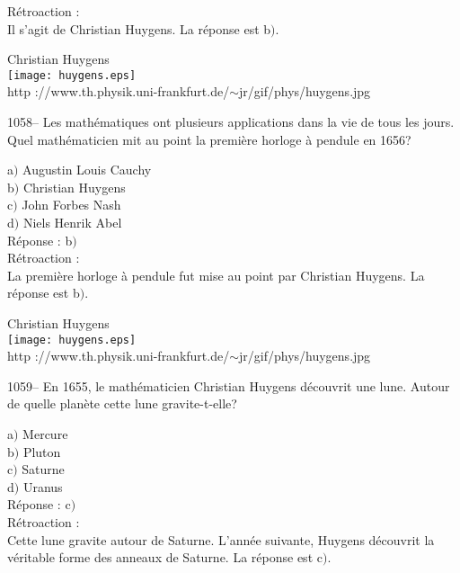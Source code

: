 ﻿\documentclass[letterpaper, 12pt]{article}
\begin{document}
R\'etroaction : \\
Il s'agit de Christian Huygens.
La r\'eponse est b$)$.\\

        \begin{center}
        Christian Huygens\\
    \texttt{[image: huygens.eps]}\\
        {\footnotesize http
://www.th.physik.uni-frankfurt.de/$\sim$jr/gif/phys/huygens.jpg}
    \end{center}

1058-- Les math\'ematiques ont plusieurs applications dans la vie de
tous les jours. Quel math\'ematicien mit au point la premi\`ere
horloge \`a pendule en 1656?

a$)$ Augustin Louis Cauchy \\
b$)$ Christian Huygens  \\
c$)$ John Forbes Nash  \\
d$)$ Niels Henrik Abel \\

R\'eponse : b$)$\\

R\'etroaction : \\
La premi\`ere horloge \`a pendule fut mise au point par Christian
Huygens.
La r\'eponse est b$)$.\\

        \begin{center}
        Christian Huygens\\
    \texttt{[image: huygens.eps]}\\
        {\footnotesize http
://www.th.physik.uni-frankfurt.de/$\sim$jr/gif/phys/huygens.jpg}
    \end{center}

1059-- En 1655, le math\'ematicien Christian Huygens d\'ecouvrit une
lune. Autour de quelle plan\`ete cette lune gravite-t-elle?

a$)$ Mercure \\
b$)$ Pluton  \\
c$)$ Saturne  \\
d$)$ Uranus \\

R\'eponse : c$)$\\

R\'etroaction : \\
Cette lune gravite autour de Saturne. L'ann\'ee suivante, Huygens
d\'ecouvrit la v\'eritable forme des anneaux de Saturne.
La r\'eponse est c$)$.\\
\end{document}

